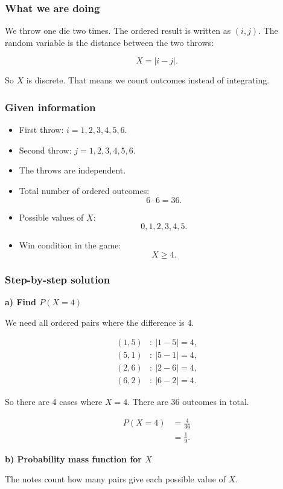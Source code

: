 \documentclass[10pt]{article}
\begin{document}
\subsubsection*{What we are doing}
We throw one die two times.
The ordered result is written as \((i,j)\).
The random variable is the distance between the two throws:

\[
X=|i-j|.
\]

So \(X\) is discrete.
That means we count outcomes instead of integrating.

\subsubsection*{Given information}
\begin{itemize}
\item
First throw: \(i=1,2,3,4,5,6\).
\item
Second throw: \(j=1,2,3,4,5,6\).
\item
The throws are independent.
\item
Total number of ordered outcomes:
\[
6\cdot 6=36.
\]
\item
Possible values of \(X\):
\[
0,1,2,3,4,5.
\]
\item
Win condition in the game:
\[
X\ge 4.
\]
\end{itemize}

\subsubsection*{Step-by-step solution}

\textbf{a) Find \(P(X=4)\)}

We need all ordered pairs where the difference is 4.

\begin{align*}
(1,5)&:\ |1-5|=4,\\
(5,1)&:\ |5-1|=4,\\
(2,6)&:\ |2-6|=4,\\
(6,2)&:\ |6-2|=4.
\end{align*}

So there are 4 cases where \(X=4\).
There are 36 outcomes in total.

\begin{align*}
P(X=4)
&=
\frac{4}{36}\\[2mm]
&=
\frac{1}{9}.
\end{align*}

\textbf{b) Probability mass function for \(X\)}

The notes count how many pairs give each possible value of \(X\).
\end{document}
